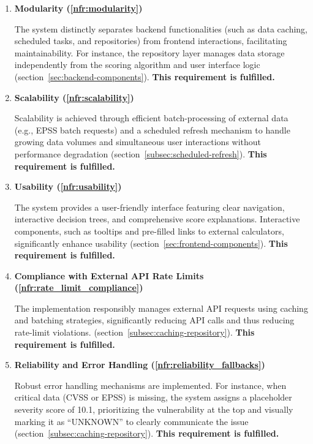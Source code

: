 \begin{enumerate}
    
    \item \textbf{Modularity (\ref{nfr:modularity})}
	      	      
    The system distinctly separates backend functionalities (such as data caching, scheduled tasks, and repositories) from frontend interactions, facilitating maintainability. For instance, the repository layer manages data storage independently from the scoring algorithm and user interface logic (section~\ref{sec:backend-components}). \textbf{This requirement is fulfilled.}
	      	            
    \item \textbf{Scalability (\ref{nfr:scalability})}
	      	            
    Scalability is achieved through efficient batch-processing of external data (e.g., \ac{EPSS} batch requests) and a scheduled refresh mechanism to handle growing data volumes and simultaneous user interactions without performance degradation (section~\ref{subsec:scheduled-refresh}). \textbf{This requirement is fulfilled.}
	      	            
    \item \textbf{Usability (\ref{nfr:usability})}
	      	            
    The system provides a user-friendly interface featuring clear navigation, interactive decision trees, and comprehensive score explanations. Interactive components, such as tooltips and pre-filled links to external calculators, significantly enhance usability (section~\ref{sec:frontend-components}). \textbf{This requirement is fulfilled.}
	      	      
    \item \textbf{Compliance with External \ac{API} Rate Limits (\ref{nfr:rate_limit_compliance})}
	      	            
    The implementation responsibly manages external \ac{API} requests using caching and batching strategies, significantly reducing \ac{API} calls and thus reducing rate-limit violations. (section~\ref{subsec:caching-repository}). \textbf{This requirement is fulfilled.}
	      	      
    \item \textbf{Reliability and Error Handling (\ref{nfr:reliability_fallbacks})}
	      	            
    Robust error handling mechanisms are implemented. For instance, when critical data (\ac{CVSS} or \ac{EPSS}) is missing, the system assigns a placeholder severity score of 10.1, prioritizing the vulnerability at the top and visually marking it as \enquote{UNKNOWN} to clearly communicate the issue (section~\ref{subsec:caching-repository}). \textbf{This requirement is fulfilled.}
	      	            

\end{enumerate}
